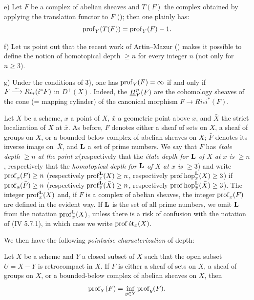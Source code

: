 \begin{remarques}
e) Let $F$ be a complex of abelian sheaves and $T(F)$ the complex obtained by applying the translation functor to $F$ (\cite{XIV.3}); then one plainly has:
$$
\prof_Y(T(F))=\prof_Y(F)-1.
$$

f) Let us point out that the recent work of Artin--Mazur (\cite{XIV.1}) makes it possible to define the notion of homotopical depth $\geq n$ for every integer $n$ (not only for $n\geq 3$).

g) Under the conditions of  3), one has $\prof_Y(F)=\infty$ if and only if $F\isomto Ri_*(i^*F)$ in $D^+(X)$. Indeed, the ${\h}_Y^p(F)$ are the cohomology sheaves of the cone (= mapping cylinder) of the canonical morphism $F\to Ri_*i^*(F)$.
\end{remarques}

\begin{definition} \label{XIV.1.7}
Let $X$ be a scheme, $x$ a point of $X$, $\bar x$ a geometric point above $x$, and $\bar X$ the strict localization of $X$ at $\bar x$. As before, $F$ denotes either a sheaf of sets on $X$, a sheaf of groups on $X$, or a bounded-below complex of abelian sheaves on $X$; $\bar F$ denotes its inverse image on~$\bar X$, and $\LL$ a set of prime numbers. We say that $F$ has \emph{étale depth $\geq n$ at the point $x$}\pageoriginale (respectively that the \emph{étale depth for $\LL$ of $X$ at $x$ is $\geq n$}, respectively that the \emph{homotopical depth for $\LL$ of $X$ at $x$ is $\geq 3$}) and write $\prof_x(F)\geq n$ (respectively $\prof_x^{\LL}(X)\geq n$, respectively $\prof \hop_x^{\LL}(X)\geq \sisi{3}{3}$) if $\prof_{\bar x}(\bar F)\geq n$ (respectively $\prof_{\bar x}^{\LL}(\bar X)\geq\nobreak n$, respectively $\prof \hop_{\bar x}^{\LL}(\bar X)\geq \sisi{3}{3}$). The integer $\prof_x^{\LL}(X)$ and, if $F$ is a complex of abelian sheaves, the integer $\prof_x(F)$ are defined in the evident way. If $\LL$ is the set of all prime numbers, we omit $\LL$ from the notation $\prof_x^{\LL}(X)$, unless there is a risk of confusion with the notation of \textup{(\EGA IV 5.7.1)}, in which case we write $\prof \et_x(X)$.
\end{definition}

We then have the following \textit{pointwise characterization} of depth:

\begin{theoreme} \label{XIV.1.8} Let $X$ be a scheme and $Y$ a closed subset of $X$ such that the open subset $U=X-Y$ is retrocompact in $X$. If $F$ is either a sheaf of sets on $X$, a sheaf of groups on $X$, or a bounded-below complex of abelian sheaves on $X$, then
$$
\prof_Y(F)=\inf_{y\in Y} \prof_y(F).
$$
\end{theoreme}


